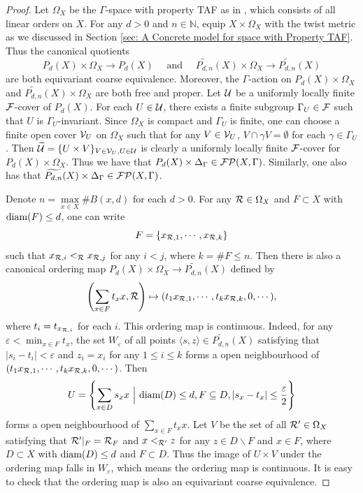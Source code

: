 \documentclass[11pt]{article}
\theoremstyle{definition}
\theoremstyle{plain}
\def\IN{\mathbb N}\def\IR{\mathbb R}\def\IE{\mathbb E}\def\IC{\mathbb C}\def\IL{\mathbb L}\def\IQ{\mathbb Q}\def\IA{\mathbb A}\def\IZ{\mathbb Z}
\def\MRdnX{\widetilde{P_{d,n}}(X)}
\def\diam{\textup{diam}}
\def\Ga{\Gamma}
\begin{document}
\begin{proof}
Let $\Omega_{X}$ be the $\Ga$-space with property TAF as in , which consists of all linear orders on $X$. For any $d>0$ and $n\in\IN$, equip $X\times\Omega_X$ with the twist metric as we discussed in Section \ref{sec: A Concrete model for space with Property TAF}. Thus the canonical quotients
$$P_d(X)\times\Omega_X\to P_d(X)\quad\text{ and }\quad \MRdnX\times\Omega_X\to\MRdnX$$
are both equivariant coarse equivalence. Moreover, the $\Ga$-action on $P_d(X)\times\Omega_X$ and $\MRdnX\times\Omega_X$ are both free and proper. Let $\mathcal U$ be a uniformly locally finite $\mathcal F$-cover of $P_d(X)$. For each $U\in\mathcal U$, there exists a finite subgroup $\Ga_U\in\F$ such that $U$ is $\Ga_U$-invariant. Since $\Omega_X$ is compact and $\Gamma_U$ is finite, one can choose a finite open cover $\mathcal V_U$ on $\Omega_X$ such that for any $V\in\mathcal V_U$, $V\cap \gamma V=\emptyset$ for each $\gamma\in\Ga_U$. Then $\widetilde{\mathcal U}=\{U\times V\}_{V\in\mathcal V_U,U\in\mathcal U}$ is clearly a uniformly locally finite $\mathcal F$-cover for $P_d(X)\times\Omega_X$. Thus we have that $P_d(X)\times\Delta_{\Ga}\in\F\P(X,\Ga)$. Similarly, one also has that $\MRdnX\times\Delta_{\Ga}\in\F\P(X,\Ga)$. 

Denote $n=\max\limits_{x\in X}\#B(x,d)$ for each $d>0$. For any $\mathcal R\in \Omega_X$ and $F\subset X$ with $\diam(F)\leq d$, one can write
$$F=\{x_{\mathcal R,1},\cdots,x_{\mathcal R,k}\}$$
such that $x_{\mathcal R,i}<_{\mathcal R}x_{\mathcal R,j}$ for any $i< j$, where $k=\#F\leq n$. Then there is also a canonical ordering map $P_d(X)\times\Omega_X\to\MRdnX$ defined by 
\begin{equation}\label{eq:ordering_map}
    \left(\sum_{x\in F}t_xx,\mathcal R\right)\mapsto (t_{1}x_{\mathcal R,1},\cdots,t_{k}x_{\mathcal R,k},0,\cdots),
\end{equation}
where $t_i=t_{x_{\mathcal R,i}}$ for each $i$. This ordering map is continuous. Indeed, for any $\varepsilon<\min_{x\in F}{t_x}$, the set $W_{\varepsilon}$ of all points $\langle s,z\rangle\in\MRdnX$ satisfying that $|s_i-t_i|<\varepsilon$ and $z_i=x_i$ for any $1\leq i\leq k$ forms a open neighbourhood of $(t_{1}x_{\mathcal R,1},\cdots,t_{k}x_{\mathcal R,k},0,\cdots)$. Then
$$U=\left\{\sum_{x\in D}s_xx\ \Big|\ \diam(D)\leq d,F\subseteq D,|s_x-t_x|\leq \frac{\varepsilon}{2}\right\}$$
forms a open neighbourhood of $\sum_{x\in F}t_xx$. Let $V$ be the set of all $\mathcal R'\in\Omega_X$ satisfying that $\mathcal R'|_F=\mathcal R_F$ and $x<_{\mathcal R'}z$ for any $z\in D\backslash F$ and $x\in F$, where $D\subset X$ with $\diam(D)\leq d$ and $F\subset D$. Thus the image of $U\times V$ under the ordering map falls in $W_{\varepsilon}$, which means the ordering map is continuous. It is easy to check that the ordering map is also an equivariant coarse equivalence.


\end{proof}
\end{document}
